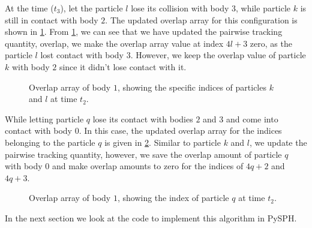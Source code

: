 At the time ($t_3$), let the particle $l$ lose its collision with body $3$,
while particle $k$ is still in contact with body $2$. The updated overlap array
for this configuration is shown in \cref{fig:id:overlap_of_k_f_at_t_2}. From
\cref{fig:id:overlap_of_k_f_at_t_2}, we can see that we have updated the
pairwise tracking quantity, overlap, we make the overlap array value at index
$4l+3$ zero, as the particle $l$ lost contact with body $3$. However, we keep
the overlap value of particle $k$ with body $2$ since it didn't lose contact
with it.

\begin{figure}[!htpb]
  \centering
  \footnotesize
  \caption{Overlap array of body $1$, showing the specific indices of
    particles $k$ and $l$ at time $t_2$.}
\label{fig:id:overlap_of_k_f_at_t_2}
\end{figure}
While letting particle $q$ lose its contact with bodies $2$ and $3$ and come
into contact with body $0$. In this case, the updated overlap array for the
indices belonging to the particle $q$ is given in
\cref{fig:id:overlap_of_q_at_t_2}. Similar to particle $k$ and $l$, we update
the pairwise tracking quantity, however, we save the overlap amount of particle
$q$ with body $0$ and make overlap amounts to zero for the indices of $4q+2$ and
$4q+3$.
\begin{figure}[!htpb]
  \centering
  \footnotesize
  \caption{Overlap array of body $1$, showing the index of
    particle $q$ at time $t_2$.}
\label{fig:id:overlap_of_q_at_t_2}
\end{figure}
In the next section we look at the code to implement this algorithm in
PySPH.

